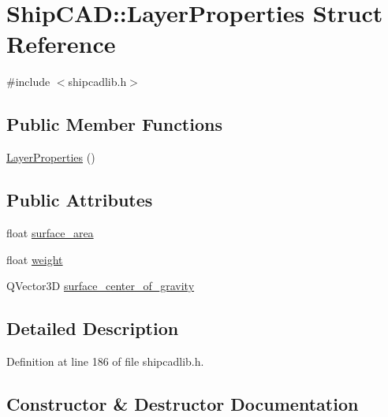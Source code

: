 \hypertarget{structShipCAD_1_1LayerProperties}{}\section{Ship\+C\+AD\+:\+:Layer\+Properties Struct Reference}
\label{structShipCAD_1_1LayerProperties}


{\ttfamily \#include $<$shipcadlib.\+h$>$}

\subsection*{Public Member Functions}
\begin{DoxyCompactItemize}
\item 
\hyperlink{structShipCAD_1_1LayerProperties_ad48a1f9351ff4270868f56bd1211af09}{Layer\+Properties} ()
\end{DoxyCompactItemize}
\subsection*{Public Attributes}
\begin{DoxyCompactItemize}
\item 
float \hyperlink{structShipCAD_1_1LayerProperties_aff6dab68937efc1abd7bb5066373f514}{surface\+\_\+area}
\item 
float \hyperlink{structShipCAD_1_1LayerProperties_a4e9844dd95994725401ad93c5c3a00e9}{weight}
\item 
Q\+Vector3D \hyperlink{structShipCAD_1_1LayerProperties_a1b4bc8254c8cb90df594bc7905ce3e22}{surface\+\_\+center\+\_\+of\+\_\+gravity}
\end{DoxyCompactItemize}


\subsection{Detailed Description}


Definition at line 186 of file shipcadlib.\+h.



\subsection{Constructor \& Destructor Documentation}
